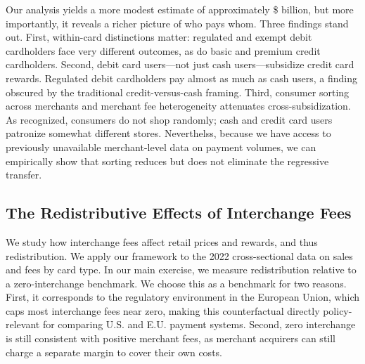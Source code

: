 \documentclass[main.tex]{subfiles}
\begin{document}
Our analysis yields a more modest estimate of approximately \$ billion, but more importantly, it reveals a richer picture of who pays whom. Three findings stand out. First, within-card distinctions matter: regulated and exempt debit cardholders face very different outcomes, as do basic and premium credit cardholders. Second, debit card users---not just cash users---subsidize credit card rewards. Regulated debit cardholders pay almost as much as cash users, a finding obscured by the traditional credit-versus-cash framing. Third, consumer sorting across merchants and merchant fee heterogeneity attenuates cross-subsidization. As \citet{Gans2018} recognized, consumers do not shop randomly; cash and credit card users patronize somewhat different stores. Neverthelss, because we have access to previously unavailable merchant-level data on payment volumes, we can empirically show that sorting reduces but does not eliminate the regressive transfer.


\subsection{The Redistributive Effects of Interchange Fees\label{subsec:eliminate-interchange}}

We study how interchange fees affect retail prices and rewards, and thus redistribution. 
We apply our framework to the 2022 cross-sectional data on sales and fees by card type.
In our main exercise, we measure redistribution relative to a zero-interchange benchmark.
We choose this as a benchmark for two reasons.
First, it corresponds to the regulatory environment in the European Union, which caps most interchange fees near zero, making this counterfactual directly policy-relevant for comparing U.S. and E.U. payment systems.
Second, zero interchange is still consistent with positive merchant fees, as merchant acquirers can still charge a separate margin to cover their own costs.

\end{document}
